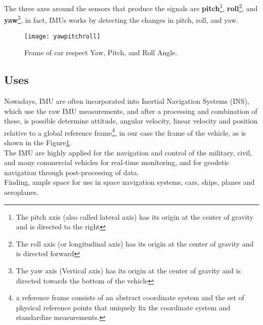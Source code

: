 \documentclass{standalone}
\begin{document}
\noindent The three axes around the sensors that produce the signals are \textbf{pitch}\footnote{The pitch axis (also called lateral axis) has its origin at the center of gravity and is directed to the right}, \textbf{roll}\footnote{The roll axis (or longitudinal axis) has its origin at the center of gravity and is directed forward}, and \textbf{yaw}\footnote{The yaw axis (Vertical axis) has its origin at the center of gravity and is directed towards the bottom of the vehicle}, in fact, IMUs works by detecting the changes in pitch, roll, and yaw.

\begin{center}
\begin{figure}[h]
\centering
\label{fig:Yaw Roll Pitch Frame of car}
\texttt{[image: yawpitchroll]}
\caption{Frame of car respect Yaw, Pitch, and Roll Angle.}
\end{figure}
\end{center}
\clearpage	
	
	
\subsection{Uses}\label{IMU Uses}
\noindent Nowadays, IMU are often incorporated into Inertial Navigation Systems (INS), which use the raw IMU measurements, and after a processing and combination of these, is possible determine attitude, angular velocity, linear velocity and position relative to a global reference frame\footnote{a reference frame consists of an abstract coordinate system and the set of physical reference points that uniquely fix the coordinate system and standardize measurements.}, in our case the frame of the vehicle, as is shown in the Figure\ref{fig:Yaw Roll Pitch Frame of car}.\\ 
The IMU are highly applied for the navigation and control of the military, civil, and many commercial vehicles for real-time monitoring, and for geodetic navigation through post-processing of data.\\
Finding, ample space for use in space navigation systems, cars, ships, planes and aeroplanes.\\
\end{document}
